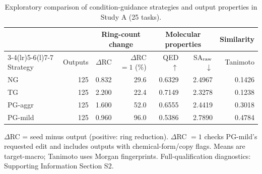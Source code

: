 \begin{table}[H]
\centering\small
\caption{Exploratory comparison of condition-guidance strategies and output properties in Study A (25 tasks).}
\label{tab:historical_strategies}
\setlength{\tabcolsep}{3.5pt}
\renewcommand{\arraystretch}{1.12}
\begin{tabular*}{\linewidth}{@{\extracolsep{\fill}}lrrrrrr@{}}
\toprule
 & & \multicolumn{2}{c}{Ring-count change} & \multicolumn{2}{c}{Molecular properties} & Similarity \\
\cmidrule(lr){3-4}\cmidrule(lr){5-6}\cmidrule(l){7-7}
Strategy & Outputs & $\Delta$RC & $\Delta$RC $=1$ (\%) & QED $\uparrow$ & SA$_{\rm raw}$ $\downarrow$ & Tanimoto \\
\midrule
NG & 125 & 0.832 & 29.6 & 0.6329 & 2.4967 & 0.1426 \\
TG & 125 & 2.200 & 22.4 & 0.7149 & 2.3278 & 0.1238 \\
PG-aggr & 125 & 1.600 & 52.0 & 0.6555 & 2.4419 & 0.3018 \\
PG-mild & 125 & 0.960 & 96.0 & 0.5386 & 2.7890 & 0.4784 \\
\bottomrule
\end{tabular*}
\par\smallskip
\begin{minipage}{\linewidth}\footnotesize
$\Delta$RC = seed minus output (positive: ring reduction). $\Delta$RC $=1$ checks PG-mild's requested edit and includes outputs with chemical-form/copy flags. Means are target-macro; Tanimoto uses Morgan fingerprints. Full-qualification diagnostics: Supporting Information Section S2.
\end{minipage}
\end{table}
